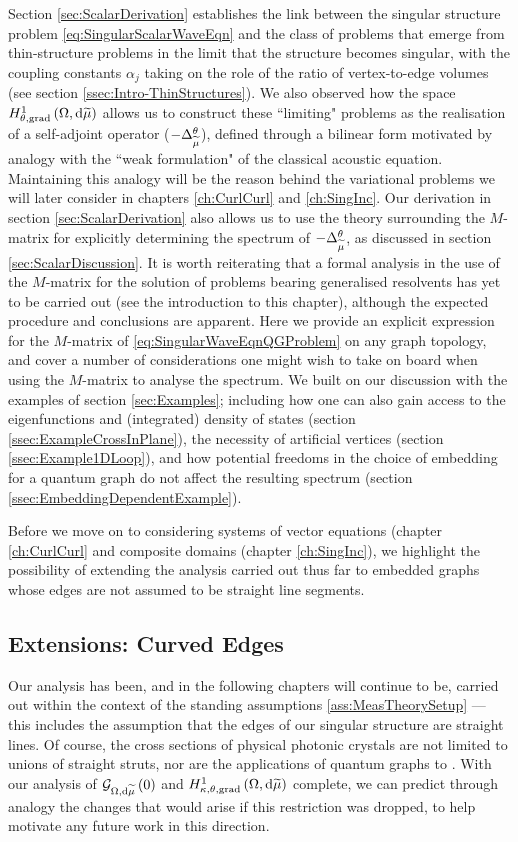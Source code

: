 Section \ref{sec:ScalarDerivation} establishes the link between the singular structure problem \eqref{eq:SingularScalarWaveEqn} and the class of problems that emerge from thin-structure problems in the limit that the structure becomes singular, with the coupling constants $\alpha_j$ taking on the role of the ratio of vertex-to-edge volumes (see section \ref{ssec:Intro-ThinStructures}).
We also observed how the space $H^1_{\theta, \mathrm{grad}}\left( \Omega, \mathrm{d}\widetilde{\mu} \right)$ allows us to construct these ``limiting" problems as the realisation of a self-adjoint operator ($-\Delta_{\widetilde{\mu}}^{\theta}$), defined through a bilinear form motivated by analogy with the ``weak formulation" of the classical acoustic equation.
Maintaining this analogy will be the reason behind the variational problems we will later consider in chapters \ref{ch:CurlCurl} and \ref{ch:SingInc}.
Our derivation in section \ref{sec:ScalarDerivation} also allows us to use the theory surrounding the $M$-matrix for explicitly determining the spectrum of $-\Delta_{\widetilde{\mu}}^{\theta}$, as discussed in section \ref{sec:ScalarDiscussion}.
It is worth reiterating that a formal analysis in the use of the $M$-matrix for the solution of problems bearing generalised resolvents has yet to be carried out (see the introduction to this chapter), although the expected procedure and conclusions are apparent.
Here we provide an explicit expression for the $M$-matrix of \eqref{eq:SingularWaveEqnQGProblem} on any graph topology, and cover a number of considerations one might wish to take on board when using the $M$-matrix to analyse the spectrum.
We built on our discussion with the examples of section \ref{sec:Examples}; including how one can also gain access to the eigenfunctions and (integrated) density of states (section \ref{ssec:ExampleCrossInPlane}), the necessity of artificial vertices (section \ref{ssec:Example1DLoop}), and how potential freedoms in the choice of embedding for a quantum graph do not affect the resulting spectrum (section \ref{ssec:EmbeddingDependentExample}).

Before we move on to considering systems of vector equations (chapter \ref{ch:CurlCurl} and composite domains (chapter \ref{ch:SingInc}), we highlight the possibility of extending the analysis carried out thus far to embedded graphs whose edges are not assumed to be straight line segments.

\subsection{Extensions: Curved Edges} \label{ssec:CurvedEdges}
Our analysis has been, and in the following chapters will continue to be, carried out within the context of the standing assumptions \ref{ass:MeasTheorySetup} --- this includes the assumption that the edges of our singular structure are straight lines.
Of course, the cross sections of physical photonic crystals are not limited to unions of straight struts, nor are the applications of quantum graphs to .
With our analysis of $\mathcal{G}_{ \Omega, \mathrm{d}\widetilde{\mu}}\left( 0 \right)$ and $H^1_{\kappa,\theta,\mathrm{grad}}\left( \Omega, \mathrm{d}\widetilde{\mu} \right)$ complete, we can predict through analogy the changes that would arise if this restriction was dropped, to help motivate any future work in this direction.

